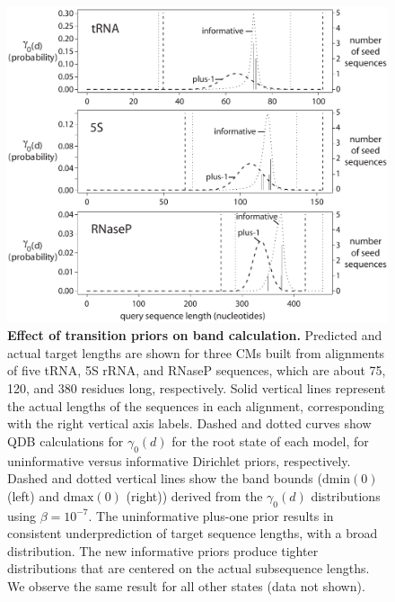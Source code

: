 \begin{figure}
  \begin{center}
    \includegraphics[width=6in,angle=0]{figs/bands}
    \caption{\textbf{Effect of transition priors on band calculation.}
      Predicted and actual target lengths are shown for three CMs
      built from alignments of five tRNA, 5S rRNA, and RNaseP
      sequences, which are about 75, 120, and 380 residues long,
      respectively.  Solid vertical lines represent the actual lengths
      of the sequences in each alignment, corresponding with the right
      vertical axis labels. Dashed and dotted curves show QDB
      calculations for $\gamma_0(d)$ for the root state of each model,
      for uninformative versus informative Dirichlet priors,
      respectively.  Dashed and dotted vertical lines show the band
      bounds ($\mbox{dmin}(0)$ (left) and $\mbox{dmax}(0)$
      (right)) derived from the $\gamma_0(d)$ distributions using
      $\beta = 10^{-7}$. The uninformative plus-one prior results in
      consistent underprediction of target sequence lengths, with a
      broad distribution. The new informative priors produce tighter
      distributions that are centered on the actual subsequence
      lengths. We observe the same result for all other states
      (data not shown).}
    \label{fig:bands}
  \end{center}
\end{figure}
